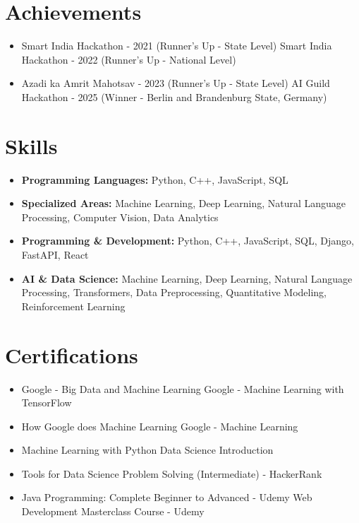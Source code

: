 \documentclass[a4paper,10pt]{article}
\begin{document}
\section*{Achievements}
\begin{itemize}
\item Smart India Hackathon - 2021 (Runner's Up - State Level) \hfill Smart India Hackathon - 2022 (Runner's Up - National Level)
\item Azadi ka Amrit Mahotsav - 2023 (Runner's Up - State Level) \hfill AI Guild Hackathon - 2025 (Winner - Berlin and Brandenburg State, Germany)
\end{itemize}

\section*{Skills}
\begin{itemize}
  \item \textbf{Programming Languages:} Python, C++, JavaScript, SQL
  \item \textbf{Specialized Areas:} Machine Learning, Deep Learning, Natural Language Processing, Computer Vision, Data Analytics
  \item \textbf{Programming \& Development:} Python, C++, JavaScript, SQL, Django, FastAPI, React
  \item \textbf{AI \& Data Science:} Machine Learning, Deep Learning, Natural Language Processing, Transformers, Data Preprocessing, Quantitative Modeling, Reinforcement Learning
\end{itemize}

\section*{Certifications}
\begin{itemize}
\item Google - Big Data and Machine Learning \hfill Google - Machine Learning with TensorFlow
\item How Google does Machine Learning \hfill Google - Machine Learning
\item Machine Learning with Python \hfill Data Science Introduction
\item Tools for Data Science \hfill Problem Solving (Intermediate) - HackerRank
\item Java Programming: Complete Beginner to Advanced - Udemy \hfill Web Development Masterclass Course - Udemy
\end{itemize}
\end{document}
